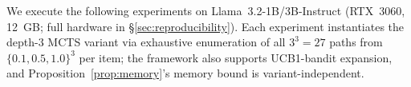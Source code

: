 We execute the following experiments on Llama~3.2-1B/3B-Instruct (RTX~3060, 12~GB; full hardware in §\ref{sec:reproducibility}). Each experiment instantiates the depth-$3$ MCTS variant via exhaustive enumeration of all $3^3 = 27$ paths from $\{0.1, 0.5, 1.0\}^3$ per item; the framework also supports UCB1-bandit expansion, and Proposition~\ref{prop:memory}'s memory bound is variant-independent.

